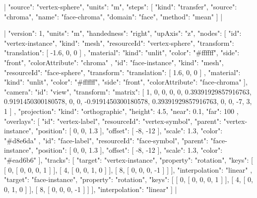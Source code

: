 \documentclass{article}
\begin{document}
|{
  "source": "vertex-sphere",
  "units": "m",
  "steps": [
    {
      "kind": "transfer",
      "source": "chroma",
      "name": "face-chroma",
      "domain": "face",
      "method": "mean"
    }
  ]
}|

\loomspace|{
  "version": 1,
  "units": "m",
  "handedness": "right",
  "upAxis": "z",
  "nodes": [
    {
      "id": "vertex-instance",
      "kind": "mesh",
      "resourceId": "vertex-sphere",
      "transform": {
        "translation": [
          -1.6,
          0,
          0
        ]
      },
      "material": {
        "kind": "unlit",
        "color": "#ffffff",
        "side": "front",
        "colorAttribute": "chroma"
      }
    },
    {
      "id": "face-instance",
      "kind": "mesh",
      "resourceId": "face-sphere",
      "transform": {
        "translation": [
          1.6,
          0,
          0
        ]
      },
      "material": {
        "kind": "unlit",
        "color": "#ffffff",
        "side": "front",
        "colorAttribute": "face-chroma"
      }
    }
  ],
  "camera": {
    "id": "view",
    "transform": {
      "matrix": [
        1,
        0,
        0,
        0,
        0,
        0.39391929857916763,
        0.9191450300180578,
        0,
        0,
        -0.9191450300180578,
        0.39391929857916763,
        0,
        0,
        -7,
        3,
        1
      ]
    },
    "projection": {
      "kind": "orthographic",
      "height": 4.5,
      "near": 0.1,
      "far": 100
    }
  },
  "overlays": [
    {
      "id": "vertex-label",
      "resourceId": "vertex-symbol",
      "parent": "vertex-instance",
      "position": [
        0,
        0,
        1.3
      ],
      "offset": [
        -8,
        -12
      ],
      "scale": 1.3,
      "color": "#d8e6da"
    },
    {
      "id": "face-label",
      "resourceId": "face-symbol",
      "parent": "face-instance",
      "position": [
        0,
        0,
        1.3
      ],
      "offset": [
        -8,
        -12
      ],
      "scale": 1.3,
      "color": "#ead6b6"
    }
  ],
  "tracks": [
    {
      "target": "vertex-instance",
      "property": "rotation",
      "keys": [
        [
          0,
          [
            0,
            0,
            0,
            1
          ]
        ],
        [
          4,
          [
            0,
            0,
            1,
            0
          ]
        ],
        [
          8,
          [
            0,
            0,
            0,
            -1
          ]
        ]
      ],
      "interpolation": "linear"
    },
    {
      "target": "face-instance",
      "property": "rotation",
      "keys": [
        [
          0,
          [
            0,
            0,
            0,
            1
          ]
        ],
        [
          4,
          [
            0,
            0,
            1,
            0
          ]
        ],
        [
          8,
          [
            0,
            0,
            0,
            -1
          ]
        ]
      ],
      "interpolation": "linear"
    }
  ]
}|
\end{document}

